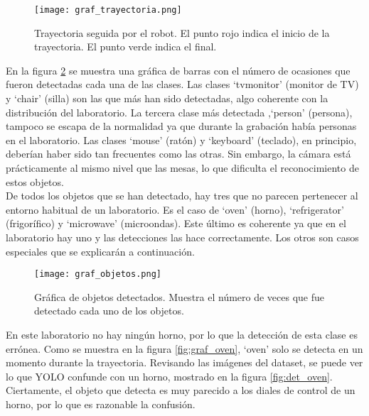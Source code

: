 \begin{figure}[h]
	\begin{center} 
		\texttt{[image: graf\_trayectoria.png]}
	\end{center}
	\caption{Trayectoria seguida por el robot. El punto rojo indica el inicio de la trayectoria. El punto verde indica el final.}
	\label{fig:graf_trayectoria}
\end{figure}

En la figura \ref{fig:graf_objetos} se muestra una gráfica de barras con el número de ocasiones que fueron detectadas cada una de las clases. Las clases `tvmonitor' (monitor de TV) y `chair' (silla) son las que más han sido detectadas, algo coherente con la distribución del laboratorio. La tercera clase más detectada ,`person' (persona), tampoco se escapa de la normalidad ya que durante la grabación había personas en el laboratorio. Las clases `mouse' (ratón) y `keyboard' (teclado), en principio, deberían haber sido tan frecuentes como las otras. Sin embargo, la cámara está prácticamente al mismo nivel que las mesas, lo que dificulta el reconocimiento de estos objetos.\\

De todos los objetos que se han detectado, hay tres que no parecen pertenecer al entorno habitual de un laboratorio. Es el caso de `oven' (horno), `refrigerator' (frigorífico) y `microwave' (microondas). Este último es coherente ya que en el laboratorio hay uno y las detecciones las hace correctamente. Los otros son casos especiales que se explicarán a continuación.\\

\begin{figure}[h]
	\begin{center} 
		\texttt{[image: graf\_objetos.png]}
	\end{center}
	\caption{Gráfica de objetos detectados. Muestra el número de veces que fue detectado cada uno de los objetos.}
	\label{fig:graf_objetos}
\end{figure}

En este laboratorio no hay ningún horno, por lo que la detección de esta clase es errónea. Como se muestra en la figura \ref{fig:graf_oven}, `oven' solo se detecta en un momento durante la trayectoria. Revisando las imágenes del dataset, se puede ver lo que YOLO confunde con un horno, mostrado en la figura \ref{fig:det_oven}. Ciertamente, el objeto que detecta es muy parecido a los diales de control de un horno, por lo que es razonable la confusión.\\

